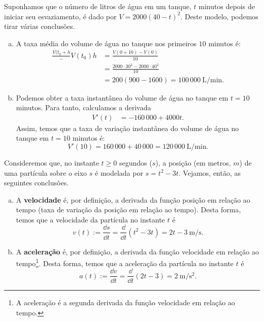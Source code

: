 \begin{ex}
  Suponhamos que o número de litros de água em um tanque, $t$ minutos depois de iniciar seu esvaziamento, é dado por $V = 2000(40-t)^2$. Deste modelo, podemos tirar várias conclusões.
  \begin{enumerate}[a)]
  \item A taxa média do volume de água no tanque nos primeiros $10$ minutos é:
    \begin{align}
      \frac{V(t_0+h}-V(t_0){h} &= \frac{V(0+10)-V(0)}{10} \\
                               &= \frac{2000\cdot 30^2-2000\cdot 40^2}{10} \\
                               &= 200(900-1600) = 100\,000 ~ \text{L}/\text{min}.
    \end{align}
  \item Podemos obter a taxa instantânea do volume de água no tanque em $t=10$ minutos. Para tanto, calculamos a derivada
    \begin{align}
      V'(t) &= -160\,000 + 4000t. 
    \end{align}
    Assim, temos que a taxa de variação instantânea do volume de água no tanque em $t=10$ minutos é:
    \begin{equation}
      V'(10) = 160\,000+40\,000 = 120\,000 ~\text{L}/\text{min}.
    \end{equation}
  \end{enumerate}
\end{ex}

\begin{ex}
  Consideremos que, no instante $t\geq 0$ segundos ($s$), a posição (em metros, $m$) de uma partícula sobre o eixo $s$ é modelada por $s = t^2-3t$. Vejamos, então, as seguintes conclusões.
  \begin{enumerate}[a)]
  \item A {\bf velocidade} é, por definição, a derivada da função posição em relação ao tempo (taxa de variação da posição em relação ao tempo). Desta forma, temos que a velocidade da partícula no instante $t$ é
    \begin{equation}
      v(t) := \frac{\dd s}{\dd t} = \frac{\dd}{\dd t}(t^2-3t) = 2t-3 ~ \text{m}/\text{s}.
    \end{equation}
  \item A {\bf aceleração} é, por definição, a derivada da função velocidade em relação ao tempo\footnote{A aceleração é a segunda derivada da função velocidade em relação ao tempo.}. Desta forma, temos que a aceleração da partícula no instante $t$ é
    \begin{equation}
      a(t) := \frac{\dd v}{\dd t} = \frac{\dd}{\dd t}(2t-3) = 2 ~ \text{m}/\text{s}^2.
    \end{equation}
  \end{enumerate}
\end{ex}

